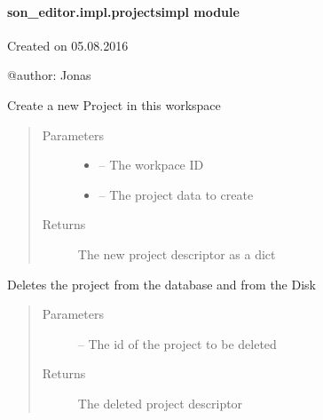 \documentclass[letterpaper,10pt,english]{sphinxmanual}
\begin{document}
\paragraph{son\_editor.impl.projectsimpl module}
\label{_source/son_editor.impl:module-son_editor.impl.projectsimpl}\label{_source/son_editor.impl:son-editor-impl-projectsimpl-module}
Created on 05.08.2016

@author: Jonas

\begin{fulllineitems}
\label{_source/son_editor.impl:son_editor.impl.projectsimpl.create_project}
Create a new Project in this workspace
\begin{quote}\begin{description}
\item[{Parameters}] \leavevmode\begin{itemize}
\item {} 
 -- The workpace ID

\item {} 
 -- The project data to create

\end{itemize}

\item[{Returns}] \leavevmode
The new project descriptor as a dict

\end{description}\end{quote}

\end{fulllineitems}


\begin{fulllineitems}
\label{_source/son_editor.impl:son_editor.impl.projectsimpl.delete_project}
Deletes the project from the database and from the Disk
\begin{quote}\begin{description}
\item[{Parameters}] \leavevmode
{} -- The id of the project to be deleted

\item[{Returns}] \leavevmode
The deleted project descriptor

\end{description}\end{quote}

\end{fulllineitems}
\end{document}
